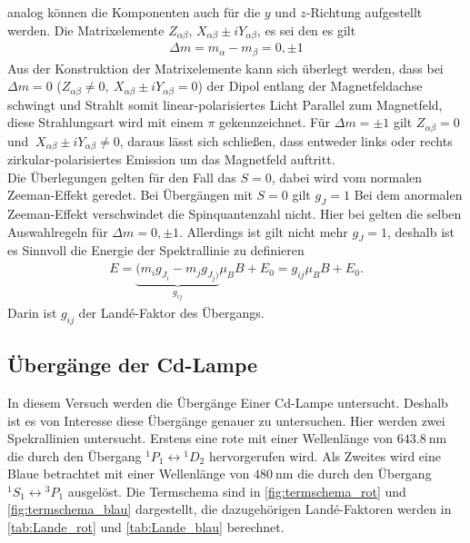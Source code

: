 analog können die Komponenten auch für die $y$ und $z$-Richtung aufgestellt werden.
Die Matrixelemente $Z_{\alpha\beta}$, $X_{\alpha\beta}\pm i Y_{\alpha\beta}$, es sei den es gilt
\begin{align}
	\Delta m = m_\alpha-m_\beta = 0,\pm1
\end{align}
Aus der Konstruktion der Matrixelemente kann sich überlegt werden, dass bei $\Delta m=0$ ($Z_{\alpha\beta}\not=0,\ X_{\alpha\beta}\pm i Y_{\alpha\beta}=0$) der Dipol entlang der Magnetfeldachse schwingt und Strahlt somit linear-polarisiertes Licht Parallel zum Magnetfeld, diese Strahlungsart wird mit einem $\pi$ gekennzeichnet.
Für $\Delta m =\pm1$ gilt $Z_{\alpha\beta}=0$ und $\ X_{\alpha\beta}\pm i Y_{\alpha\beta}\not=0$, daraus lässt sich schließen, dass entweder links oder rechts zirkular-polarisiertes Emission um das Magnetfeld auftritt.\\
Die Überlegungen gelten für den Fall das $S=0$, dabei wird vom normalen Zeeman-Effekt geredet.
Bei Übergängen mit $S=0$ gilt $g_J=1$
Bei dem anormalen Zeeman-Effekt verschwindet die Spinquantenzahl nicht.
Hier bei gelten die selben Auswahlregeln für $\Delta m=0,\pm1$.
Allerdings ist gilt nicht mehr $g_J=1$, deshalb ist es Sinnvoll die Energie der Spektrallinie zu definieren
\begin{align}
	E=\underbrace{(m_ig_{J_i}-m_jg_{J_j)}}_{g_{ij}}\mu_BB+E_0=g_{ij}\mu_BB+E_0.
\end{align}
Darin ist $g_{ij}$ der Landé-Faktor des Übergangs.
\subsection{Übergänge der Cd-Lampe}
In diesem Versuch werden die Übergänge Einer Cd-Lampe untersucht.
Deshalb ist es von Interesse diese Übergänge genauer zu untersuchen.
Hier werden zwei Spekrallinien untersucht.
Erstens eine rote mit einer Wellenlänge von $\SI{643,8}{\nano\meter}$ die durch den Übergang ${}^1P_1\leftrightarrow{}^1D_2$ hervorgerufen wird.
Als Zweites wird eine Blaue betrachtet mit einer Wellenlänge von $\SI{480}{\nano\meter}$ die durch den Übergang ${}^1S_1\leftrightarrow{}^3P_1$ ausgelöst. 
Die Termschema sind in \cref{fig:termschema_rot} und \cref{fig:termschema_blau} dargestellt, die dazugehörigen Landé-Faktoren werden in \cref{tab:Lande_rot} und \cref{tab:Lande_blau} berechnet.

